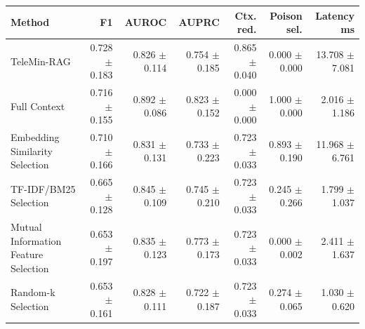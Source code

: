 \begin{tabular}{lrrrrrr}
\toprule
Method & F1 & AUROC & AUPRC & Ctx. red. & Poison sel. & Latency ms \\
\midrule
TeleMin-RAG & 0.728 $\pm$ 0.183 & 0.826 $\pm$ 0.114 & 0.754 $\pm$ 0.185 & 0.865 $\pm$ 0.040 & 0.000 $\pm$ 0.000 & 13.708 $\pm$ 7.081 \\
Full Context & 0.716 $\pm$ 0.155 & 0.892 $\pm$ 0.086 & 0.823 $\pm$ 0.152 & 0.000 $\pm$ 0.000 & 1.000 $\pm$ 0.000 & 2.016 $\pm$ 1.186 \\
Embedding Similarity Selection & 0.710 $\pm$ 0.166 & 0.831 $\pm$ 0.131 & 0.733 $\pm$ 0.223 & 0.723 $\pm$ 0.033 & 0.893 $\pm$ 0.190 & 11.968 $\pm$ 6.761 \\
TF-IDF/BM25 Selection & 0.665 $\pm$ 0.128 & 0.845 $\pm$ 0.109 & 0.745 $\pm$ 0.210 & 0.723 $\pm$ 0.033 & 0.245 $\pm$ 0.266 & 1.799 $\pm$ 1.037 \\
Mutual Information Feature Selection & 0.653 $\pm$ 0.197 & 0.835 $\pm$ 0.123 & 0.773 $\pm$ 0.173 & 0.723 $\pm$ 0.033 & 0.000 $\pm$ 0.002 & 2.411 $\pm$ 1.637 \\
Random-k Selection & 0.653 $\pm$ 0.161 & 0.828 $\pm$ 0.111 & 0.722 $\pm$ 0.187 & 0.723 $\pm$ 0.033 & 0.274 $\pm$ 0.065 & 1.030 $\pm$ 0.620 \\
\bottomrule
\end{tabular}

